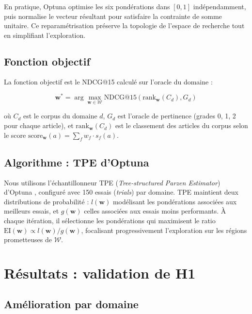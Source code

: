 En pratique, Optuna optimise les six pondérations dans $[0, 1]$
indépendamment, puis normalise le vecteur résultant pour satisfaire
la contrainte de somme unitaire. Ce reparamétrisation préserve
la topologie de l'espace de recherche tout en simplifiant l'exploration.

\subsection{Fonction objectif}

La fonction objectif est le NDCG@15 calculé sur l'oracle du domaine :

\begin{equation}
  \mathbf{w}^* = \arg\max_{\mathbf{w} \in \mathcal{W}}
    \text{NDCG@15}\!\left(\text{rank}_{\mathbf{w}}(C_d), G_d\right)
  \label{eq:optimization_objective}
\end{equation}

où $C_d$ est le corpus du domaine $d$, $G_d$ est l'oracle de pertinence
(grades 0, 1, 2 pour chaque article), et $\text{rank}_{\mathbf{w}}(C_d)$
est le classement des articles du corpus selon le score
$\text{score}_{\mathbf{w}}(a) = \sum_f w_f \cdot s_f(a)$.

\subsection{Algorithme : TPE d'Optuna}

Nous utilisons l'échantillonneur TPE (\textit{Tree-structured Parzen
Estimator}) d'Optuna \cite{akiba2019optuna}, configuré avec 150 essais
(\textit{trials}) par domaine. TPE maintient deux distributions
de probabilité : $l(\mathbf{w})$ modélisant les pondérations associées
aux meilleurs essais, et $g(\mathbf{w})$ celles associées aux essais
moins performants. À chaque itération, il sélectionne les pondérations
qui maximisent le ratio $\text{EI}(\mathbf{w}) \propto l(\mathbf{w})/g(\mathbf{w})$,
focalisant progressivement l'exploration sur les régions prometteuses
de $\mathcal{W}$.

\section{Résultats : validation de H1}

\subsection{Amélioration par domaine}

